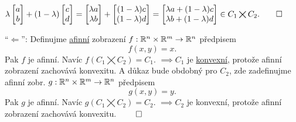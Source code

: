 $
\lambda \begin{bmatrix}
    a \\
    b
\end{bmatrix}
+ (1-\lambda)
\begin{bmatrix}
    c \\
    d
\end{bmatrix} =
\begin{bmatrix}
    \lambda a \\
    \lambda b
\end{bmatrix}
+
\begin{bmatrix}
    (1-\lambda)c \\
    (1-\lambda)d
\end{bmatrix}
=
\begin{bmatrix} %
    \lambda a + (1-\lambda)c \\
    \lambda b + (1-\lambda)d
\end{bmatrix} \in C_1 \bigtimes C_2. \qed$

\enquote{$\Leftarrow$}: Definujme \hyperref[sec:afin]{afinní} zobrazení $f : \mathbb{R}^n \times \mathbb{R}^m \rightarrow \mathbb{R}^n$ předpisem
\[ f(x,y) = x \text{.}\]
Pak $f$ je afinní. Navíc $f(C_1 \bigtimes C_2) = C_1$. $\implies C_1$ je \hyperref[sec:konvex]{konvexní}, protože afinní
zobrazení zachovává konvexitu.
A důkaz bude obdobný pro $C_2$, zde zadefinujme afinní zobr. $g : \mathbb{R}^n \times \mathbb{R}^m \rightarrow \mathbb{R}^n$ předpisem
\[ g(x,y) = y \text{.}\]
Pak $g$ je afinní. Navíc $g(C_1 \bigtimes C_2) = C_2$. $\implies C_2$ je konvexní, protože afinní zobrazení zachovává
konvexitu. $\qed$

